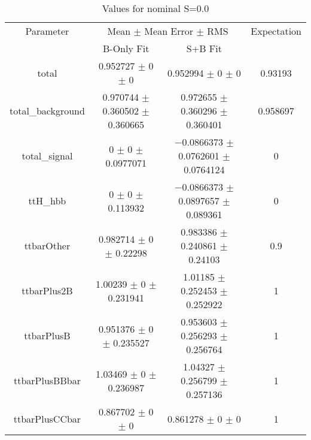 \begin{table}
\centering
\caption{Values for nominal S=0.0}
\begin{tabular}{cccc}
\toprule
Parameter & \multicolumn{2}{c}{Mean $\pm$ Mean Error $\pm$ RMS} & Expectation\\
 & B-Only Fit & S+B Fit & \\
\midrule
total & \num{0.952727} $\pm$ \num{0} $\pm$ \num{0} & \num{0.952994} $\pm$ \num{0} $\pm$ \num{0} & \num{0.93193}\\
total\_background & \num{0.970744} $\pm$ \num{0.360502} $\pm$ \num{0.360665} & \num{0.972655} $\pm$ \num{0.360296} $\pm$ \num{0.360401} & \num{0.958697}\\
total\_signal & \num{0} $\pm$ \num{0} $\pm$ \num{0.0977071} & \num{-0.0866373} $\pm$ \num{0.0762601} $\pm$ \num{0.0764124} & \num{0}\\
ttH\_hbb & \num{0} $\pm$ \num{0} $\pm$ \num{0.113932} & \num{-0.0866373} $\pm$ \num{0.0897657} $\pm$ \num{0.089361} & \num{0}\\
ttbarOther & \num{0.982714} $\pm$ \num{0} $\pm$ \num{0.22298} & \num{0.983386} $\pm$ \num{0.240861} $\pm$ \num{0.24103} & \num{0.9}\\
ttbarPlus2B & \num{1.00239} $\pm$ \num{0} $\pm$ \num{0.231941} & \num{1.01185} $\pm$ \num{0.252453} $\pm$ \num{0.252922} & \num{1}\\
ttbarPlusB & \num{0.951376} $\pm$ \num{0} $\pm$ \num{0.235527} & \num{0.953603} $\pm$ \num{0.256293} $\pm$ \num{0.256764} & \num{1}\\
ttbarPlusBBbar & \num{1.03469} $\pm$ \num{0} $\pm$ \num{0.236987} & \num{1.04327} $\pm$ \num{0.256799} $\pm$ \num{0.257136} & \num{1}\\
ttbarPlusCCbar & \num{0.867702} $\pm$ \num{0} $\pm$ \num{0} & \num{0.861278} $\pm$ \num{0} $\pm$ \num{0} & \num{1}\\
\bottomrule
\end{tabular}
\end{table}